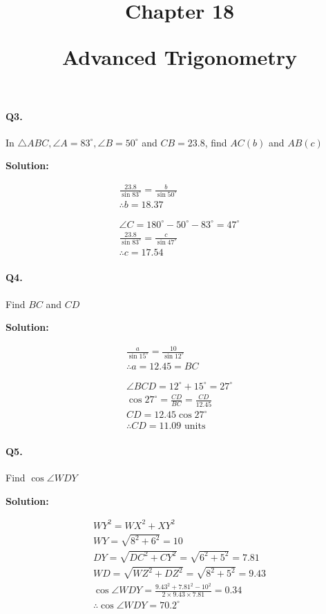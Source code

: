 \documentclass{article}
\title{Chapter 18

  Advanced Trigonometry}
\date{}
\begin{document}
\paragraph{Q3.}
In $\triangle ABC, \angle A = 83^{\circ}, \angle B= 50^{\circ}$ and $CB=23.8$, find $AC(b)$ and $AB(c)$

{\scriptsize \textbf{Solution:}}

\[
  \begin{aligned}
    \frac{23.8}{\sin 83^{\circ}} = \frac{b}{\sin 50^{\circ}} \\
    \therefore b = 18.37 \\
    \\
    \\
    \angle C = 180^{\circ}-50^{\circ}-83^{\circ}=47^{\circ} \\
    \frac{23.8}{\sin 83^{\circ}} = \frac{c}{\sin 47^{\circ}} \\
    \therefore c = 17.54
  \end{aligned}
\]

\paragraph{Q4.}
Find $BC$ and $CD$

{\scriptsize \textbf{Solution:}}

\[
  \begin{aligned}
    \frac{a}{\sin 15^{\circ}} = \frac{10}{\sin 12^{\circ}} \\
    \therefore a = 12.45 = BC \\
    \\
    \\
    \angle BCD = 12^{\circ}+15^{\circ}=27^{\circ} \\
    \cos 27^{\circ} = \frac{CD}{BC} = \frac{CD}{12.45} \\
    CD = 12.45 \cos 27^{\circ} \\
    \therefore CD = 11.09 \text{ units}
  \end{aligned}
\]

\paragraph{Q5.}
Find $\cos \angle WDY$

{\scriptsize \textbf{Solution:}}

\[
  \begin{aligned}
    WY^{2} = WX^{2} + XY^{2} \\
    WY = \sqrt{8^{2}+6^{2}} = 10 \\
    DY = \sqrt{DC^{2}+CY^{2}} = \sqrt{6^{2}+5^{2}} = 7.81 \\
    WD = \sqrt{WZ^{2}+DZ^{2}} = \sqrt{8^{2}+5^{2}} = 9.43 \\
    \cos \angle WDY = \frac{9.43^{2}+7.81^{2}-10^{2}}{2\times9.43\times7.81} = 0.34 \\
    \therefore \cos \angle WDY = 70.2^{\circ}
  \end{aligned}
\]
\end{document}
